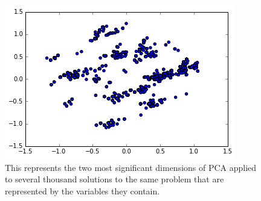 \begin{figure}
     \centering
  	 \includegraphics[width=\textwidth]{Body/figures/pca_of_solution_variables.png}
     \caption[PCA on Solutions Represented by Abstract Variables]{This represents the two most significant dimensions of PCA applied to several thousand solutions to the same problem that are represented by the variables they contain.}
     \label{fig:solutions_variables_pca}
\end{figure}

